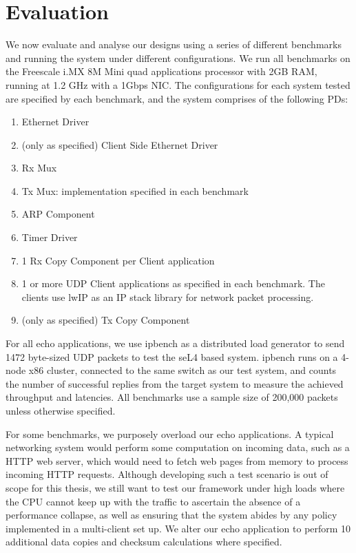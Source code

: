 \chapter{Evaluation}\label{ch:evaluation}

We now evaluate and analyse our designs using a series of different benchmarks and running
the system under different configurations. We run all benchmarks on the
Freescale i.MX 8M Mini quad applications processor with 2GB RAM, running at 1.2 GHz
with a 1Gbps NIC. The configurations for each system tested are specified by each benchmark,
and the system comprises of the following PDs:
\begin{enumerate}
    \item Ethernet Driver
    \item (only as specified) Client Side Ethernet Driver
    \item Rx Mux
    \item Tx Mux: implementation specified in each benchmark
    \item ARP Component
    \item Timer Driver
    \item 1 Rx Copy Component per Client application
    \item 1 or more UDP Client applications as specified in each benchmark. 
        The clients use lwIP \cite{Dunkels_01} as an IP stack library for network packet processing. 
    \item (only as specified) Tx Copy Component
\end{enumerate}

For all echo applications, we use ipbench as a distributed load generator 
to send 1472 byte-sized UDP packets to test the seL4 based system. ipbench runs on a 4-node x86 cluster, 
connected to the same switch as our test system,
and counts the number of successful replies from the target system to measure the achieved throughput and latencies.
All benchmarks use a sample size of 200,000 packets unless otherwise specified. 

For some benchmarks, we purposely overload our echo applications. A typical networking system would
perform some computation on incoming data, such as a HTTP web server, which would need to fetch web pages from
memory to process incoming HTTP requests. Although developing such a test scenario is out of scope for this thesis,
we still want to test our framework under high loads where the CPU cannot keep up with the traffic to ascertain the absence
of a performance collapse, as well as ensuring that the system abides by any policy implemented in a multi-client set up. 
We alter our echo application to perform 10 additional data copies and checksum calculations where specified.

